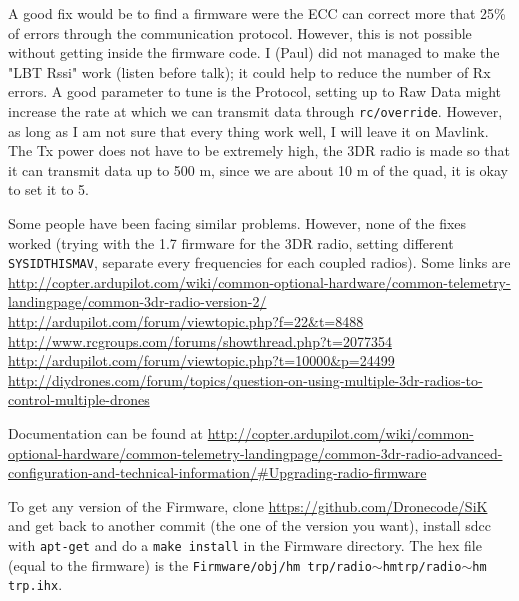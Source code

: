 \documentclass[titlepage,11pt,a4paper]{article}
\begin{document}
\begin{appendices}
A good fix would be to find a firmware were the ECC can correct more
that 25\% of errors through the communication protocol. However, this is
not possible without getting inside the firmware code. I (Paul) did
not managed to make the "LBT Rssi" work (listen before talk); it could
help to reduce the number of Rx errors. A good parameter to tune is
the Protocol, setting up to Raw Data might increase the rate at which
we can transmit data through \texttt{rc/override}. However, as long as
I am not sure that every thing work well, I will leave it on Mavlink.
The Tx power does not have to be extremely high, the 3DR radio is made
so that it can transmit data up to 500 m, since we are about 10 m of
the quad, it is okay to set it to 5.

Some people have been facing similar problems. However, none of the
fixes worked (trying with the 1.7 firmware for the 3DR radio, setting
different \texttt{SYSID\textunderscore THISMAV}, separate every
frequencies for each coupled radios). Some links are
\\ \url{http://copter.ardupilot.com/wiki/common-optional-hardware/common-telemetry-landingpage/common-3dr-radio-version-2/}
\\ \url{http://ardupilot.com/forum/viewtopic.php?f=22&t=8488}
\\ \url{http://www.rcgroups.com/forums/showthread.php?t=2077354}
\\ \url{http://ardupilot.com/forum/viewtopic.php?t=10000&p=24499}
\\ \url{http://diydrones.com/forum/topics/question-on-using-multiple-3dr-radios-to-control-multiple-drones}

Documentation can be found at
\url{http://copter.ardupilot.com/wiki/common-optional-hardware/common-telemetry-landingpage/common-3dr-radio-advanced-configuration-and-technical-information/#Upgrading-radio-firmware}

To get any version of the Firmware, clone
\url{https://github.com/Dronecode/SiK} and get back to another commit
(the one of the version you want), install sdcc with \texttt{apt-get}
and do a \texttt{make install} in the Firmware directory. The hex file
(equal to the firmware) is the \texttt{Firmware/obj/hm\textunderscore
  trp/radio$\sim$hm\textunderscore trp/radio$\sim$hm\textunderscore
  trp.ihx}.

\end{appendices}
\end{document}
